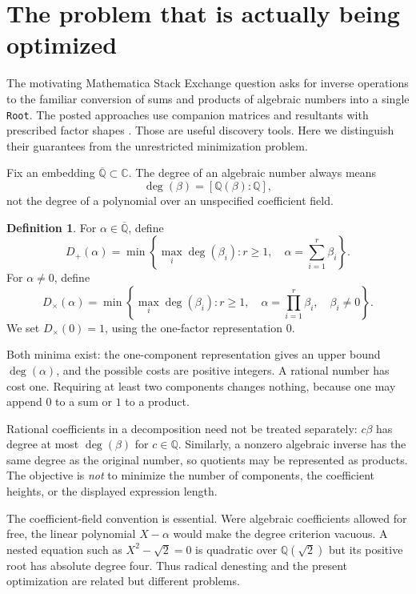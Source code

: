 \documentclass[11pt,a4paper]{article}
\newcommand{\Q}{\mathbb Q}
\newcommand{\C}{\mathbb C}
\newcommand{\Qbar}{\overline{\mathbb Q}}
\newcommand{\dplus}{D_{+}}
\newcommand{\dtimes}{D_{\times}}
\newcommand{\code}[1]{\texttt{#1}}
\theoremstyle{definition}
\newtheorem{definition}[theorem]{Definition}
\theoremstyle{remark}
\begin{document}
\tableofcontents
\newpage

\section{The problem that is actually being optimized}
\label{sec:problem}
The motivating Mathematica Stack Exchange question asks for inverse operations to the familiar conversion of sums and products of algebraic numbers into a single \code{Root}. The posted approaches use companion matrices and resultants with prescribed factor shapes \cite{question}. Those are useful discovery tools. Here we distinguish their guarantees from the unrestricted minimization problem.

Fix an embedding $\Qbar\subset\C$. The degree of an algebraic number always means
\[
 \deg(\beta)=[\Q(\beta):\Q],
\]
not the degree of a polynomial over an unspecified coefficient field.

\begin{definition}
For $\alpha\in\Qbar$, define
\[
 \dplus(\alpha)=\min\left\{\max_i\deg(\beta_i):
       r\geq1,\quad\alpha=\sum_{i=1}^r\beta_i\right\}.
\]
For $\alpha\ne0$, define
\[
 \dtimes(\alpha)=\min\left\{\max_i\deg(\beta_i):
       r\geq1,\quad\alpha=\prod_{i=1}^r\beta_i,\quad\beta_i\ne0\right\}.
\]
We set $\dtimes(0)=1$, using the one-factor representation $0$.
\end{definition}
Both minima exist: the one-component representation gives an upper bound $\deg(\alpha)$, and the possible costs are positive integers. A rational number has cost one. Requiring at least two components changes nothing, because one may append $0$ to a sum or $1$ to a product.

Rational coefficients in a decomposition need not be treated separately: $c\beta$ has degree at most $\deg(\beta)$ for $c\in\Q$. Similarly, a nonzero algebraic inverse has the same degree as the original number, so quotients may be represented as products. The objective is \emph{not} to minimize the number of components, the coefficient heights, or the displayed expression length.

The coefficient-field convention is essential. Were algebraic coefficients allowed for free, the linear polynomial $X-\alpha$ would make the degree criterion vacuous. A nested equation such as $X^2-\sqrt2=0$ is quadratic over $\Q(\sqrt2)$ but its positive root has absolute degree four. Thus radical denesting and the present optimization are related but different problems.
\end{document}
